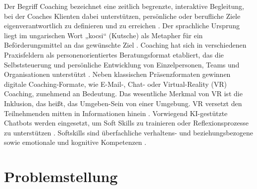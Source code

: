 Der Begriff Coaching bezeichnet eine zeitlich begrenzte, interaktive Begleitung, bei der Coaches Klienten dabei unterstützen, persönliche oder berufliche Ziele eigenverantwortlich zu definieren und zu erreichen \citep{nyfoudi2021talent}. Der sprachliche Ursprung liegt im ungarischen Wort „kocsi“ (Kutsche) als Metapher für ein Beförderungsmittel an das gewünschte Ziel \citep{sonesh2015power}.
Coaching hat sich in verschiedenen Praxisfeldern als personenorientiertes Beratungsformat etabliert, das die Selbststeuerung und
persönliche Entwicklung von Einzelpersonen, Teams und Organisationen unterstützt \citep{strong2020chatbots}. Neben
klassischen Präsenzformaten gewinnen digitale Coaching-Formate, wie E-Mail-, Chat- oder
Virtual-Reality (VR) Coaching, zunehmend an Bedeutung. 
Das wesentliche Merkmal von VR ist die Inklusion, das heißt, das Umgeben-Sein von einer Umgebung. VR versetzt den Teilnehmenden mitten in Informationen hinein \citep{bricken1990learning}. 
Vorwiegend KI-gestützte Chatbots werden eingesetzt, um Soft Skills zu trainieren oder Reflexionsprozesse
zu unterstützen \citep{mai2020ai}. Softskills sind überfachliche verhaltens- und beziehungsbezogene sowie emotionale und kognitive Kompetenzen \citep{dell2017educational, werning2023virtual}.

\section{Problemstellung}

